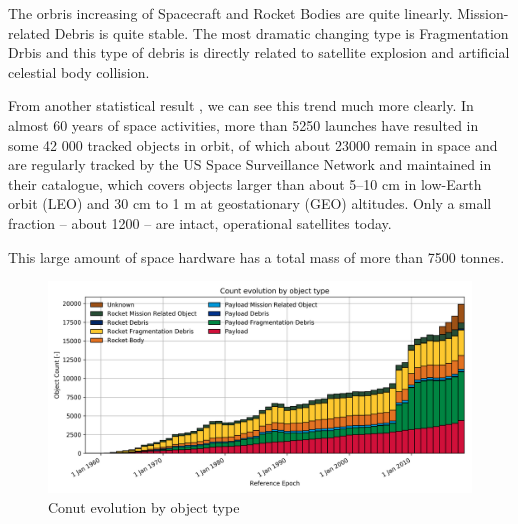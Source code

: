The orbris increasing of Spacecraft and Rocket Bodies are quite linearly. Mission-related Debris is quite stable. The most dramatic changing type is Fragmentation Drbis and this type of debris is directly related to satellite explosion and artificial celestial body collision.


From another statistical result \cite{}, we can see this trend much more clearly. In almost 60 years of space activities, more than 5250 launches have resulted in some 42 000 tracked objects in orbit, of which about 23000 remain in space and are regularly tracked by the US Space Surveillance Network and maintained in their catalogue, which covers objects larger than about 5–10 cm in low-Earth orbit (LEO) and 30 cm to 1 m at geostationary (GEO) altitudes. Only a small fraction – about 1200 – are intact, operational satellites today.

This large amount of space hardware has a total mass of more than 7500 tonnes.

\begin{figure}[ht]
\centering
\includegraphics[width=\textwidth]{fig/motivation/all_evo_type_count}
\caption{Conut evolution by object type}
\label{moti-all_evo_type_count}
\end{figure}

